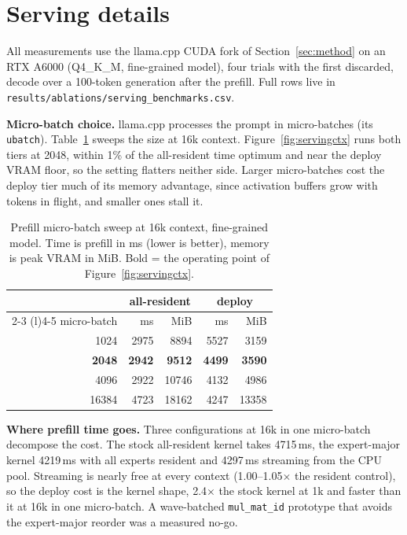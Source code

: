 \documentclass{article}
\begin{document}
\section{Serving details}\label{app:serving}

All measurements use the llama.cpp CUDA fork of Section~\ref{sec:method} on an RTX A6000
(Q4\_K\_M, fine-grained model), four trials with the first discarded, decode over a 100-token
generation after the prefill. Full rows live in
\texttt{results/ablations/serving\_benchmarks.csv}.

\textbf{Micro-batch choice.} llama.cpp processes the prompt in micro-batches (its
\texttt{ubatch}). Table~\ref{tab:ubatch} sweeps the size at 16k context.
Figure~\ref{fig:servingctx} runs both tiers at 2048, within 1\% of the all-resident time
optimum and near the deploy VRAM floor, so the setting flatters neither side. Larger
micro-batches cost the deploy tier much of its memory advantage, since activation buffers grow
with tokens in flight, and smaller ones stall it.

\begin{table}[h]
  \centering\small
  \caption{Prefill micro-batch sweep at 16k context, fine-grained model. Time is prefill in ms
  (lower is better), memory is peak VRAM in MiB. Bold = the operating point of
  Figure~\ref{fig:servingctx}.}
  \label{tab:ubatch}
  \vspace{4pt}
  \begin{tabular}{@{}rrrrr@{}}
    \toprule
    & \multicolumn{2}{c}{all-resident} & \multicolumn{2}{c}{deploy} \\
    \cmidrule(lr){2-3} \cmidrule(l){4-5}
    micro-batch & ms & MiB & ms & MiB \\
    \midrule
    1024  & 2975 & 8894  & 5527 & 3159 \\
    \textbf{2048}  & \textbf{2942} & \textbf{9512}  & \textbf{4499} & \textbf{3590} \\
    4096  & 2922 & 10746 & 4132 & 4986 \\
    16384 & 4723 & 18162 & 4247 & 13358 \\
    \bottomrule
  \end{tabular}
\end{table}

\textbf{Where prefill time goes.} Three configurations at 16k in one micro-batch decompose the
cost. The stock all-resident kernel takes 4715\,ms, the expert-major kernel 4219\,ms with all
experts resident and 4297\,ms streaming from the CPU pool. Streaming is nearly free at every
context (1.00--1.05$\times$ the resident control), so the deploy cost is the kernel shape,
2.4$\times$ the stock kernel at 1k and faster than it at 16k in one micro-batch. A wave-batched
\texttt{mul\_mat\_id} prototype that avoids the expert-major reorder was a measured no-go.
\end{document}
